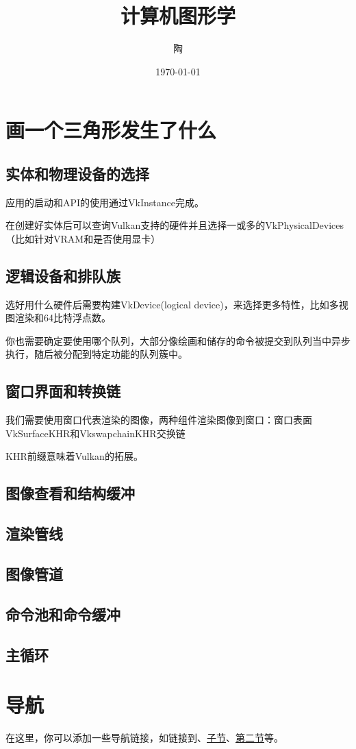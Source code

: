 \documentclass{ctexart}
\title{计算机图形学}
\author{陶}
\date{\today}
\begin{document}
\maketitle
\tableofcontents

\section{画一个三角形发生了什么}
\label{sec:first}
\subsection{实体和物理设备的选择}
应用的启动和API的使用通过VkInstance完成。

在创建好实体后可以查询Vulkan支持的硬件并且选择一或多的VkPhysicalDevices（比如针对VRAM和是否使用显卡）

\subsection{逻辑设备和排队族}
选好用什么硬件后需要构建VkDevice(logical device)，来选择更多特性，比如多视图渲染和64比特浮点数。

你也需要确定要使用哪个队列，大部分像绘画和储存的命令被提交到队列当中异步执行，随后被分配到特定功能的队列簇中。

\subsection{窗口界面和转换链}
我们需要使用窗口代表渲染的图像，两种组件渲染图像到窗口：窗口表面VkSurfaceKHR和VkswapchainKHR交换链

KHR前缀意味着Vulkan的拓展。





\subsection{图像查看和结构缓冲}
\subsection{渲染管线}
\subsection{图像管道}
\subsection{命令池和命令缓冲}
\subsection{主循环}


\clearpage

\section*{导航}
\label{sec:navigation}

在这里，你可以添加一些导航链接，如链接到、\hyperref[subsec:sub]{子节}、\hyperref[sec:second]{第二节}等。
\end{document}

